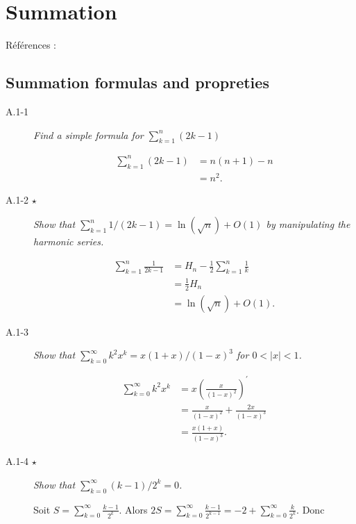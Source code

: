 \section{Summation}

R\'ef\'erences : \cite{uic_hw1}

\subsection{Summation formulas and propreties}

\begin{description}
  \item [A.1-1] {\itshape Find a simple formula for $\sum_{k=1}^n(2k-1)$ }
   \begin{ex}
  \begin{align*}
    \sum_{k=1}^n(2k-1)  & = n(n+1)-n\\
    &= n^2.
  \end{align*}
\end{ex}
\item[A.1-2 $\star$]  {\itshape Show that $\sum_{k=1}^n1/(2k-1) = \ln (\sqrt{n}) + O(1)$ by manipulating the harmonic series.}
    \begin{ex}
      \begin{align*}
        \sum_{k=1}^n \frac{1}{2k-1} &= H_n - \frac{1}{2}\sum_{k=1}^n\frac{1}{k}\\
       &= \frac{1}{2}H_n\\
       &= \ln(\sqrt{n}) + O(1).
      \end{align*}
    \end{ex}
  \item[A.1-3] {\itshape Show that $\sum_{k=0}^{\infty} k^2x^k = x(1+x)/(1-x)^3$ for $ 0 < |x| < 1$.}
    \begin{ex}
    \begin{align*}
  \sum_{k=0}^\infty k^2x^k & = x \left( \frac{x}{(1-x)^2} \right)^\prime\\
      &= \frac{x}{(1-x)^2}+\frac{2x}{(1-x)^3}\\
      &= \frac{x(1+x)}{(1-x)^3}.
    \end{align*}
  \end{ex}
\item[A.1-4 $\star$] {\itshape Show that $\sum^\infty_{k=0}(k-1)/2^k = 0$.}
    \begin{ex}
    Soit $S=\sum_{k=0}^\infty\frac{k-1}{2^k}$. Alors $2S = \sum_{k=0}^{\infty}\frac{k-1}{2^{k-1}}= -2 + \sum_{k=0}^\infty\frac{k}{2^k}$. Donc 
    \begin{align*}

\end{align*}
\end{ex}
\end{description}
